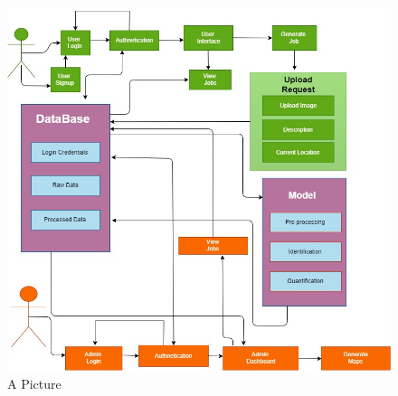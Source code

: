 \begin{figure}[!hb]
   \centering
   \includegraphics[scale=0.5]{images/8.jpeg}
   \caption{A Picture}\label{fig:picture}
\end{figure}